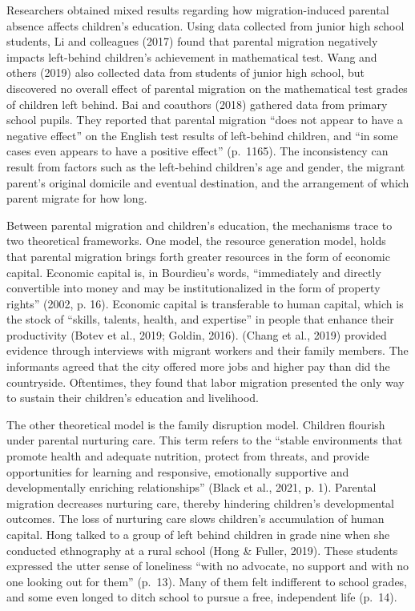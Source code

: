 \documentclass[
  man,floatsintext]{apa7}
\begin{document}
Researchers obtained mixed results regarding how migration-induced parental absence affects children's education. Using data collected from junior high school students, Li and colleagues (2017) found that parental migration negatively impacts left-behind children's achievement in mathematical test. Wang and others (2019) also collected data from students of junior high school, but discovered no overall effect of parental migration on the mathematical test grades of children left behind. Bai and coauthors (2018) gathered data from primary school pupils. They reported that parental migration ``does not appear to have a negative effect'' on the English test results of left-behind children, and ``in some cases even appears to have a positive effect'' (p.~1165). The inconsistency can result from factors such as the left-behind children's age and gender, the migrant parent's original domicile and eventual destination, and the arrangement of which parent migrate for how long.

Between parental migration and children's education, the mechanisms trace to two theoretical frameworks. One model, the resource generation model, holds that parental migration brings forth greater resources in the form of economic capital. Economic capital is, in Bourdieu's words, ``immediately and directly convertible into money and may be institutionalized in the form of property rights'' (2002, p. 16). Economic capital is transferable to human capital, which is the stock of ``skills, talents, health, and expertise'' in people that enhance their productivity (Botev et al., 2019; Goldin, 2016). (Chang et al., 2019) provided evidence through interviews with migrant workers and their family members. The informants agreed that the city offered more jobs and higher pay than did the countryside. Oftentimes, they found that labor migration presented the only way to sustain their children's education and livelihood.

The other theoretical model is the family disruption model. Children flourish under parental nurturing care. This term refers to the ``stable environments that promote health and adequate nutrition, protect from threats, and provide opportunities for learning and responsive, emotionally supportive and developmentally enriching relationships'' (Black et al., 2021, p. 1). Parental migration decreases nurturing care, thereby hindering children's developmental outcomes. The loss of nurturing care slows children's accumulation of human capital. Hong talked to a group of left behind children in grade nine when she conducted ethnography at a rural school (Hong \& Fuller, 2019). These students expressed the utter sense of loneliness ``with no advocate, no support and with no one looking out for them'' (p.~13). Many of them felt indifferent to school grades, and some even longed to ditch school to pursue a free, independent life (p.~14).
\end{document}
